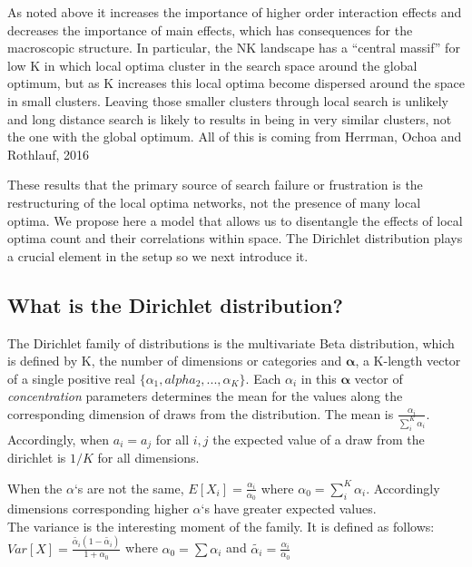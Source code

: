 \documentclass[12pt]{article}
\begin{document}
As noted above it increases the importance of higher order interaction effects and decreases the importance of main effects, which has consequences for the macroscopic structure. In particular, the NK landscape has a ``central massif'' for low K in which local optima cluster in the search space around the global optimum, but as K increases this local optima become dispersed around the space in small clusters. Leaving those smaller clusters through local search is unlikely and long distance search is likely to results in being in very similar clusters, not the one with the global optimum. {All of this is coming from Herrman, Ochoa and Rothlauf, 2016}

These results that the primary source of search failure or frustration is the restructuring of the local optima networks, not the presence of many local optima. We propose here a model that allows us to disentangle the effects of local optima count and their correlations within space. The Dirichlet distribution plays a crucial element in the setup so we next introduce it.

\subsection*{What is the Dirichlet distribution?}

The Dirichlet family of distributions is the multivariate Beta distribution, which is defined by K, the number of dimensions or categories and $\boldsymbol\alpha$, a K-length vector of a single positive real $\{\alpha_1, alpha_2, ...,\alpha_K\}$.  Each $\alpha_i$ in this $\boldsymbol\alpha$ vector of \textit{concentration} parameters determines the mean for the values along the corresponding dimension of draws from the distribution. The mean is  $\frac{\alpha_i}{\sum_{i}^{K} \alpha_i}$. Accordingly, when $a_i = a_j$ for all $i, j$  the expected value of a draw from the dirichlet is $1/K$ for all dimensions.

When the $\alpha$`s are not the same, $E[X_i] = \frac{\alpha_i}{\alpha_0}$ where $\alpha_0 = \sum_{i}^{K} \alpha_i$. Accordingly dimensions corresponding higher $\alpha$`s have greater expected values.\\

The variance is the interesting moment of the family. It is defined as follows:
$Var[X] = \frac{\tilde{\alpha_i}(1-\tilde{\alpha_i})}{1 + \alpha_0}$
where $\alpha_0 = \sum{\alpha_i}$ and $\tilde{\alpha_i} = \frac{\alpha_i}{\alpha_0}$\\
\end{document}
